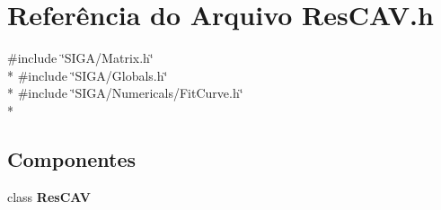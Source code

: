 \section{Referência do Arquivo Res\+C\+A\+V.\+h}
\label{_2_c_a_v_2_res_c_a_v_8h}
{\ttfamily \#include \char`\"{}S\+I\+G\+A/\+Matrix.\+h\char`\"{}}\\*
{\ttfamily \#include \char`\"{}S\+I\+G\+A/\+Globals.\+h\char`\"{}}\\*
{\ttfamily \#include \char`\"{}S\+I\+G\+A/\+Numericals/\+Fit\+Curve.\+h\char`\"{}}\\*
\subsection*{Componentes}
\begin{DoxyCompactItemize}
\item 
class {\bf Res\+C\+AV}
\end{DoxyCompactItemize}
